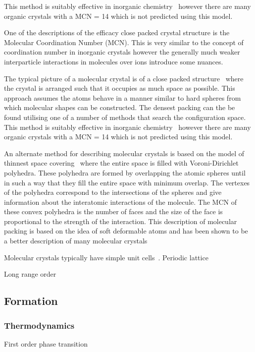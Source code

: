 This method is suitably effective in inorganic chemistry~\cite{wells:84} however there are many organic crystals with a MCN = 14 which is not predicted using this model.

One of the descriptions of the efficacy close packed crystal structure is the Molecular Coordination Number (MCN). This is very similar to the concept of coordination number in inorganic crystals however the generally much weaker interparticle interactions in molecules over ions introduce some nuances.

The typical picture of a molecular crystal is of a close packed structure~\cite{kitaigorodskii:73} where the crystal is arranged such that it occupies as much space as possible. This approach assumes the atoms behave in a manner similar to hard spheres from which molecular shapes can be constructed. The densest packing can the be found utilising one of a number of methods that search the configuration space. This method is suitably effective in inorganic chemistry~\cite{wells:84} however there are many organic crystals with a MCN = 14 which is not predicted using this model.

An alternate method for describing molecular crystals is based on the model of thinnest space covering~\cite{blatov:95} where the entire space is filled with Voroni-Dirichlet polyhedra. These polyhedra are formed by overlapping the atomic spheres until in such a way that they fill the entire space with minimum overlap. The vertexes of the polyhedra correspond to the intersections of the spheres and give information about the interatomic interactions of the molecule. The MCN of these convex polyhedra is the number of faces and the size of the face is proportional to the strength of the interaction. This description of molecular packing is based on the idea of soft deformable atoms and has been shown to be a better description of many molecular crystals~\cite{blatov:97,peresypkina:99,peresypkina:00}


Molecular crystals typically have simple unit cells~\cite{brock:94}. Periodic lattice

Long range order
\subsection{Formation}
\subsubsection{Thermodynamics}
First order phase transition

